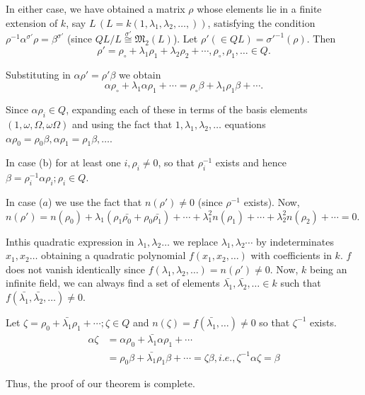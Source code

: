 In either case, we have obtained a matrix $\rho$ whose elements lie in
a finite extension of $k$, say $L\, (L= k(1, \lambda_1,  \lambda_2,
\ldots, ))$, satisfying the condition $\rho^{-1} \alpha^{\sigma '}
\rho = \beta^{\sigma '}$ (since $QL/L \overset{\sigma '}{\cong}
\mathfrak{M}_2 (L)$).  Let $\rho ' (\in Q L) = \sigma'^{-1}
(\rho)$. Then 
$$
\rho' = \rho_\circ + \lambda_1 \rho_1 + \lambda_2 \rho_2 + \cdots,
\rho_\circ,  \rho_1,  \ldots \in Q.  
$$

Substituting in $\alpha \rho' = \rho' \beta$ we obtain
$$
\alpha \rho_\circ + \lambda_1 \alpha \rho_1 + \cdots = \rho_\circ
\beta + \lambda_1 \rho_1 \beta + \cdots .  
$$

Since $\alpha \rho_i \in Q$, expanding each of these in terms of the
basis elements $(1, \omega, \Omega, \omega \Omega)$ and using the fact
that $1, \lambda_1,  \lambda_2, \ldots$ equations $\alpha \rho_0 =
\rho_0 \beta,  \alpha \rho_1 = \rho_1 \beta,  \ldots$. 

In case (b) for at least one $i, \rho_i \ne 0$, so that $\rho^{-1}_i$
exists and hence $\beta = \rho^{-1}_i \alpha \rho_i ; \rho_i \in Q$. 

In case ($a$) we use the fact that $n(\rho ') \neq 0$ (since
$\rho^{-1}$ exists). Now, $n(\rho') = n(\rho_0) + \lambda_1 (\rho_1
\bar{\rho_0} + \rho_0 \bar{\rho_1}) + \cdots + \lambda^2_1 n(\rho_1) +
\cdots + \lambda^2_2 n(\rho_2) + \cdots = 0$. 

In\pageoriginale this quadratic expression in $\lambda_1,  \lambda_2 \ldots$ we
replace $\lambda_1,  \lambda_2 \cdots$ by indeterminates $x_1,  x_2
\ldots$ obtaining a quadratic polynomial  $f(x_1,  x_2,  \ldots)$ with
coefficients in $k$. $f$ does not vanish identically since
$f(\lambda_1, \lambda_2,  \ldots) = n(\rho') \neq 0$. Now, $k$ being
an infinite field, we can always find a set of elements
$\bar{\lambda_1}, \bar{\lambda_2},  \ldots \in k$ such that
$f(\bar{\lambda_1}, \bar{\lambda_2}, \ldots) \neq 0$. 

Let $\zeta = \rho_0 + \bar{\lambda_1} \rho_1 + \cdots ; \zeta \in Q$
and $n(\zeta) = f(\bar{\lambda_1 },  \ldots) \neq 0$ so that
$\zeta^{-1}$ exists. 
\begin{align*}
  \alpha \zeta & = \alpha \rho_0 + \bar{\lambda_1} \alpha \rho_1 + \cdots\\
  & = \rho_0 \beta + \bar{\lambda_1} \rho_1 \beta + \cdots = \zeta
  \beta, i.e., \zeta^{-1} \alpha \zeta = \beta 
\end{align*}  
  
Thus, the proof of our theorem is complete.
  
